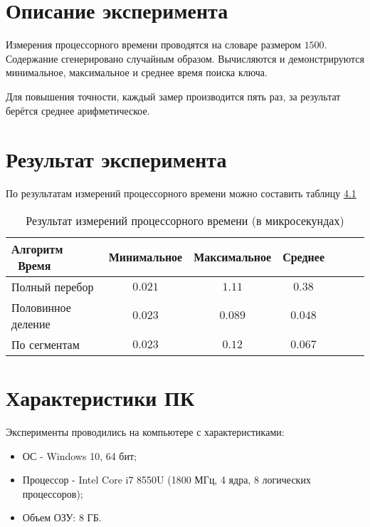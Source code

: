 \section{Описание эксперимента}
Измерения процессорного времени проводятся на словаре размером $1500$. Содержание сгенерировано случайным образом. Вычисляются и демонстрируются минимальное, максимальное и среднее время поиска ключа.

Для повышения точности, каждый замер производится пять раз, за результат берётся среднее арифметическое.

\section{Результат эксперимента}
По результатам измерений процессорного времени можно составить таблицу
\hyperref[table_4_1]{4.1}


\begin{table}[h] \label{table_4_1}
	\caption{Результат измерений процессорного времени (в микросекундах)}
	\begin{tabular}{| p{5.0cm} | c | c | c | c | c | c |}
		\hline
		Алгоритм \ Время	&Минимальное	&Максимальное	&Среднее	\\
		\hline\hline
		Полный перебор		&$0.021$		&$1.11$			&$0.38$		\\
		\hline
		Половинное деление	&$0.023$		&$0.089$		&$0.048$	\\
		\hline
		По сегментам		&$0.023$		&$0.12$			&$0.067$	\\
		\hline
	\end{tabular}
\end{table}

\section{Характеристики ПК}
Эксперименты проводились на компьютере с характеристиками:
\begin{itemize}
	\item ОС - Windows 10, 64 бит;
	\item Процессор -  Intel Core i7 8550U (1800 МГц, 4 ядра, 8 логических процессоров);
	\item Объем ОЗУ: 8 ГБ.
\end{itemize}

